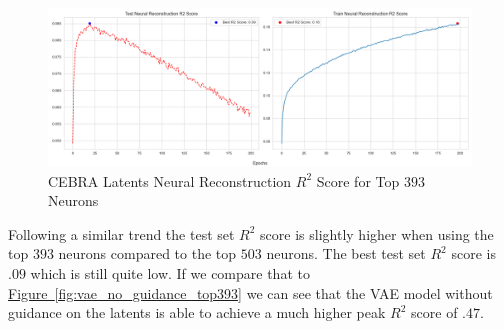 \documentclass[12pt, letterpaper]{article}
\begin{document}
\begin{figure}[H]
    \centering
    \includegraphics[width=1.0\textwidth]{cebra_x_r2_393_200_epochs_3_layer.png}
    \caption{CEBRA Latents Neural Reconstruction $R^2$ Score for Top $393$ Neurons}
    \label{fig:cebra_latents_neural_reconstruction_393}
\end{figure}

Following a similar trend the test set $R^2$ score is slightly higher when using the top $393$ neurons compared to the top $503$ neurons. The best test set $R^2$ score is $.09$ which is still quite low. If we compare that to \hyperref[fig:vae_no_guidance_top393]{Figure~\ref{fig:vae_no_guidance_top393}} we can see that the VAE model without guidance on the latents is able to achieve a much higher peak $R^2$ score of $.47$.
\end{document}

